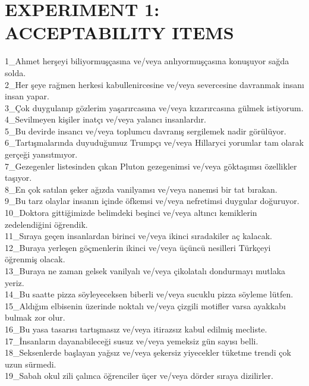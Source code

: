 \chapter{\MakeUppercase{experiment 1: acceptability items}} \label{acceptabilityitems}
\singlespacing
\begin{myparindent}{0pt}
1\_Ahmet herşeyi biliyormuşçasına ve/veya anlıyormuşçasına konuşuyor sağda solda. \\
2\_Her şeye rağmen herkesi kabullenircesine ve/veya severcesine davranmak insanı insan yapar. \\
3\_Çok duygulanıp gözlerim yaşarırcasına ve/veya kızarırcasına gülmek istiyorum. \\
4\_Sevilmeyen kişiler inatçı ve/veya yalancı insanlardır. \\
5\_Bu devirde insancı ve/veya toplumcu davranış sergilemek nadir görülüyor. \\
6\_Tartışmalarında duyuduğumuz Trumpçı ve/veya Hillaryci yorumlar tam olarak gerçeği yansıtmıyor. \\
7\_Gezegenler listesinden çıkan Pluton gezegenimsi ve/veya göktaşımsı özellikler taşıyor. \\
8\_En çok satılan şeker ağızda vanilyamsı ve/veya nanemsi bir tat bırakan. \\
9\_Bu tarz olaylar insanın içinde öfkemsi ve/veya nefretimsi duygular doğuruyor. \\
10\_Doktora gittiğimizde belimdeki beşinci ve/veya altıncı kemiklerin zedelendiğini öğrendik. \\
11\_Sıraya geçen insanlardan birinci ve/veya ikinci sıradakiler aç kalacak. \\
12\_Buraya yerleşen göçmenlerin ikinci ve/veya üçüncü nesilleri Türkçeyi öğrenmiş olacak. \\
13\_Buraya ne zaman gelsek vanilyalı ve/veya çikolatalı dondurmayı mutlaka yeriz. \\
14\_Bu saatte pizza söyleyeceksen biberli ve/veya sucuklu pizza söyleme lütfen. \\
15\_Aldığım elbisenin üzerinde noktalı ve/veya çizgili motifler varsa ayakkabı bulmak zor olur. \\
16\_Bu yasa tasarısı tartışmasız ve/veya itirazsız kabul edilmiş mecliste. \\
17\_İnsanların dayanabileceği susuz ve/veya yemeksiz gün sayısı belli. \\
18\_Seksenlerde başlayan yağsız ve/veya şekersiz yiyecekler tüketme trendi çok uzun sürmedi. \\
19\_Sabah okul zili çalınca öğrenciler üçer ve/veya dörder sıraya dizilirler. \\

\end{myparindent}
